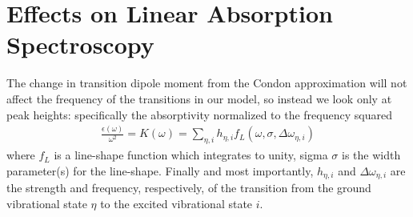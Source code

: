 \section{Effects on Linear Absorption Spectroscopy}
The change in transition dipole moment from the Condon approximation will not affect the frequency of the transitions in our model, so instead we look only at peak heights: specifically the absorptivity normalized to the frequency squared
\begin{align}
	\frac{\epsilon(\omega) }{\omega^2} = K(\omega) = \sum_{\eta,i} h_{\eta,i} f_{L} (\omega, \sigma, \Delta\omega_{\eta,i})
	\label{eqn:KDef}
\end{align}
where $f_{L}$ is a line-shape function which integrates to unity, sigma $\sigma$ is the width parameter(s) for the line-shape.  Finally and most importantly, $h_{\eta,i}$ and $\Delta\omega_{\eta,i}$ are the strength and frequency, respectively, of the transition from the ground vibrational state $\eta$ to the excited vibrational state $i$.


